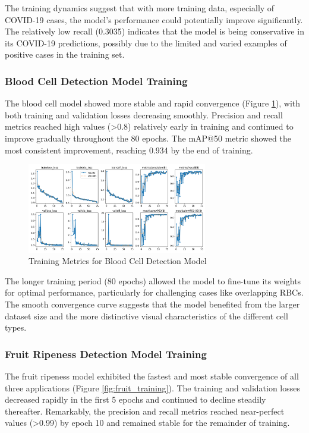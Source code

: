 \begin{multicols}{2}
The training dynamics suggest that with more training data, especially of COVID-19 cases, the model's performance could potentially improve significantly. The relatively low recall (0.3035) indicates that the model is being conservative in its COVID-19 predictions, possibly due to the limited and varied examples of positive cases in the training set.

\subsubsection{Blood Cell Detection Model Training}

The blood cell model showed more stable and rapid convergence (Figure \ref{fig:blood_cell_training}), with both training and validation losses decreasing smoothly. Precision and recall metrics reached high values (>0.8) relatively early in training and continued to improve gradually throughout the 80 epochs. The mAP@50 metric showed the most consistent improvement, reaching 0.934 by the end of training.
\end{multicols}

\begin{figure}[ht]
\centering
\includegraphics[width=0.7\textwidth]{datas/blood_cell_summary_datas/blood_cells_results.png}
\caption{Training Metrics for Blood Cell Detection Model}
\label{fig:blood_cell_training}
\end{figure}

\begin{multicols}{2}
The longer training period (80 epochs) allowed the model to fine-tune its weights for optimal performance, particularly for challenging cases like overlapping RBCs. The smooth convergence curve suggests that the model benefited from the larger dataset size and the more distinctive visual characteristics of the different cell types.

\subsubsection{Fruit Ripeness Detection Model Training}

The fruit ripeness model exhibited the fastest and most stable convergence of all three applications (Figure \ref{fig:fruit_training}). The training and validation losses decreased rapidly in the first 5 epochs and continued to decline steadily thereafter. Remarkably, the precision and recall metrics reached near-perfect values (>0.99) by epoch 10 and remained stable for the remainder of training.
\end{multicols}

